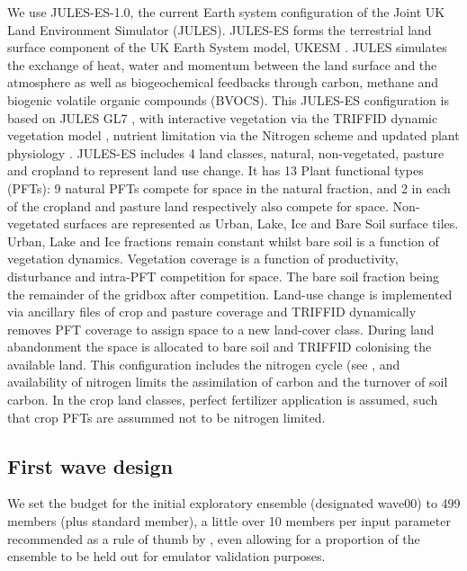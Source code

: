 \documentclass[gmd, manuscript]{copernicus}
\begin{document}
We use JULES-ES-1.0, the current Earth system configuration of the Joint UK Land Environment Simulator (JULES). JULES-ES forms the terrestrial land surface component of the UK Earth System model, UKESM \citep{sellar2019UKESM}. JULES simulates the exchange of heat, water and momentum between the land surface and the atmosphere as well as biogeochemical feedbacks through carbon, methane and biogenic volatile organic compounds (BVOCS). This JULES-ES configuration is based on JULES GL7 \citep{wiltshire2020jules}, with interactive vegetation via the TRIFFID dynamic vegetation model \citep{cox2001description}, nutrient limitation via the Nitrogen scheme \citep{wiltshire2021julescn} and updated plant physiology \citep{harper2018vegetation}. JULES-ES includes 4 land classes, natural, non-vegetated, pasture and cropland to represent land use change. It has 13 Plant functional types (PFTs): 9 natural PFTs compete for space in the natural fraction, and 2 in each of the cropland and pasture land respectively also compete for space. Non-vegetated surfaces are represented as Urban, Lake, Ice and Bare Soil surface tiles. Urban, Lake and Ice fractions remain constant whilst bare soil is a function of vegetation dynamics. Vegetation coverage is a function of productivity, disturbance and intra-PFT competition for space. The bare soil fraction being the remainder of the gridbox after competition. Land-use change is implemented via ancillary files of crop and pasture coverage and TRIFFID dynamically removes PFT coverage to assign space to a new land-cover class. During land abandonment the space is allocated to bare soil and TRIFFID colonising the available land.  This configuration includes the nitrogen cycle (see \citep{wiltshire2021julescn}, and availability of nitrogen limits the assimilation of carbon and the turnover of soil carbon. In the crop land classes, perfect fertilizer application is assumed, such that crop PFTs are assummed not to be nitrogen limited.

\subsection{First wave design}\label{ssec:first_wave_design}

We set the budget for the initial exploratory ensemble (designated wave00) to 499 members (plus standard member), a little over 10 members per input parameter recommended as a rule of thumb by \cite{loeppky2012choosing}, even allowing for a proportion of the ensemble to be held out for emulator validation purposes.
\end{document}
